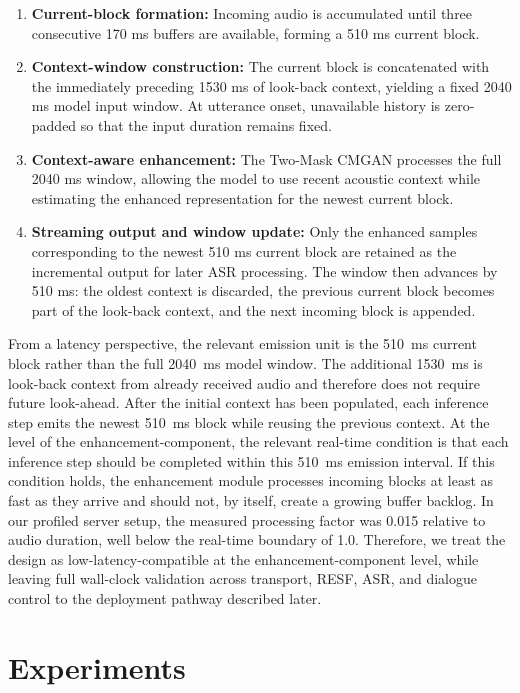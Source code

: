 \documentclass[manuscript,screen,review]{acmart}
\begin{document}
\begin{enumerate}
    \item \textbf{Current-block formation:} Incoming audio is accumulated until three consecutive 170 ms buffers are available, forming a 510 ms current block.

    \item \textbf{Context-window construction:} The current block is concatenated with the immediately preceding 1530 ms of look-back context, yielding a fixed 2040 ms model input window. At utterance onset, unavailable history is zero-padded so that the input duration remains fixed.

    \item \textbf{Context-aware enhancement:} The Two-Mask CMGAN processes the full 2040 ms window, allowing the model to use recent acoustic context while estimating the enhanced representation for the newest current block.

    \item \textbf{Streaming output and window update:} Only the enhanced samples corresponding to the newest 510 ms current block are retained as the incremental output for later ASR processing. The window then advances by 510 ms: the oldest context is discarded, the previous current block becomes part of the look-back context, and the next incoming block is appended.
\end{enumerate}

From a latency perspective, the relevant emission unit is the 510~ms current block rather than the full 2040~ms model window. The additional 1530~ms is look-back context from already received audio and therefore does not require future look-ahead. After the initial context has been populated, each inference step emits the newest 510~ms block while reusing the previous context. At the level of the enhancement-component, the relevant real-time condition is that each inference step should be completed within this 510~ms emission interval. If this condition holds, the enhancement module processes incoming blocks at least as fast as they arrive and should not, by itself, create a growing buffer backlog. In our profiled server setup, the measured processing factor was 0.015 relative to audio duration, well below the real-time boundary of 1.0. Therefore, we treat the design as low-latency-compatible at the enhancement-component level, while leaving full wall-clock validation across transport, RESF, ASR, and dialogue control to the deployment pathway described later.

 
\section{Experiments}
\end{document}
